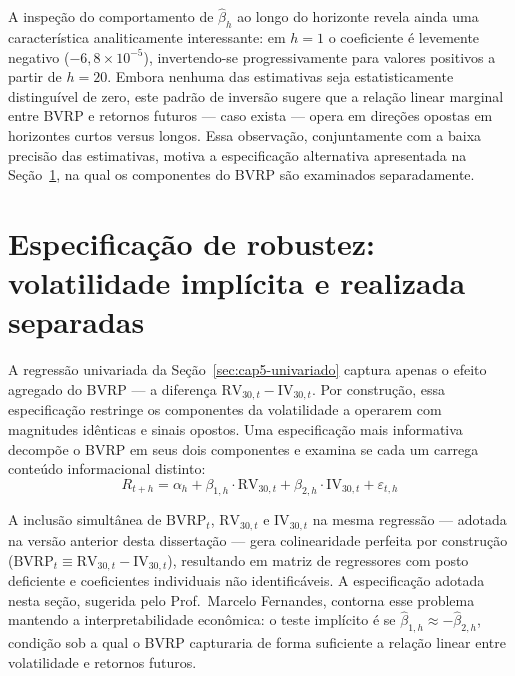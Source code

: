 A inspeção do comportamento de $\hat{\beta}_h$ ao longo do horizonte revela
ainda uma característica analiticamente interessante: em $h=1$ o coeficiente
é levemente negativo ($-6{,}8 \times 10^{-5}$), invertendo-se progressivamente
para valores positivos a partir de $h=20$. Embora nenhuma das estimativas
seja estatisticamente distinguível de zero, este padrão de inversão sugere
que a relação linear marginal entre BVRP e retornos futuros --- caso exista
--- opera em direções opostas em horizontes curtos versus longos. Essa
observação, conjuntamente com a baixa precisão das estimativas, motiva a
especificação alternativa apresentada na Seção~\ref{sec:cap5-rv-iv}, na qual
os componentes do BVRP são examinados separadamente.

\section{Especificação de robustez: volatilidade implícita e realizada separadas}
\label{sec:cap5-rv-iv}

A regressão univariada da Seção~\ref{sec:cap5-univariado} captura apenas o
efeito agregado do BVRP --- a diferença $\text{RV}_{30,t} - \text{IV}_{30,t}$.
Por construção, essa especificação restringe os componentes da volatilidade
a operarem com magnitudes idênticas e sinais opostos. Uma especificação mais
informativa decompõe o BVRP em seus dois componentes e examina se cada um
carrega conteúdo informacional distinto:
\begin{equation}
R_{t+h} = \alpha_h + \beta_{1,h} \cdot \text{RV}_{30,t} + \beta_{2,h} \cdot \text{IV}_{30,t} + \varepsilon_{t,h}
\label{eq:cap5-rv-iv}
\end{equation}

A inclusão simultânea de $\text{BVRP}_t$, $\text{RV}_{30,t}$ e
$\text{IV}_{30,t}$ na mesma regressão --- adotada na versão anterior desta
dissertação --- gera colinearidade perfeita por construção
($\text{BVRP}_t \equiv \text{RV}_{30,t} - \text{IV}_{30,t}$), resultando em
matriz de regressores com posto deficiente e coeficientes individuais não
identificáveis. A especificação adotada nesta seção, sugerida pelo
Prof.~Marcelo Fernandes, contorna esse problema mantendo a interpretabilidade
econômica: o teste implícito é se
$\hat{\beta}_{1,h} \approx -\hat{\beta}_{2,h}$, condição sob a qual o BVRP
capturaria de forma suficiente a relação linear entre volatilidade e
retornos futuros.

